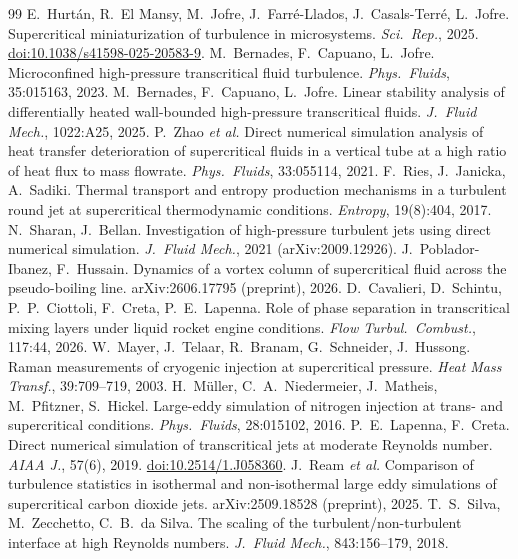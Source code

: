\documentclass[11pt]{article}
\begin{document}
\begin{thebibliography}{99}
 E.\ Hurt\'an, R.\ El Mansy, M.\ Jofre, J.\ Farr\'e-Llados, J.\ Casals-Terr\'e, L.\ Jofre. Supercritical miniaturization of turbulence in microsystems. \emph{Sci.\ Rep.}, 2025. \href{https://doi.org/10.1038/s41598-025-20583-9}{doi:10.1038/s41598-025-20583-9}.
 M.\ Bernades, F.\ Capuano, L.\ Jofre. Microconfined high-pressure transcritical fluid turbulence. \emph{Phys.\ Fluids}, 35:015163, 2023.
 M.\ Bernades, F.\ Capuano, L.\ Jofre. Linear stability analysis of differentially heated wall-bounded high-pressure transcritical fluids. \emph{J.\ Fluid Mech.}, 1022:A25, 2025.
 P.\ Zhao \emph{et al.} Direct numerical simulation analysis of heat transfer deterioration of supercritical fluids in a vertical tube at a high ratio of heat flux to mass flowrate. \emph{Phys.\ Fluids}, 33:055114, 2021.
 F.\ Ries, J.\ Janicka, A.\ Sadiki. Thermal transport and entropy production mechanisms in a turbulent round jet at supercritical thermodynamic conditions. \emph{Entropy}, 19(8):404, 2017.
 N.\ Sharan, J.\ Bellan. Investigation of high-pressure turbulent jets using direct numerical simulation. \emph{J.\ Fluid Mech.}, 2021 (arXiv:2009.12926).
 J.\ Poblador-Ibanez, F.\ Hussain. Dynamics of a vortex column of supercritical fluid across the pseudo-boiling line. arXiv:2606.17795 (preprint), 2026.
 D.\ Cavalieri, D.\ Schintu, P.\ P.\ Ciottoli, F.\ Creta, P.\ E.\ Lapenna. Role of phase separation in transcritical mixing layers under liquid rocket engine conditions. \emph{Flow Turbul.\ Combust.}, 117:44, 2026.
 W.\ Mayer, J.\ Telaar, R.\ Branam, G.\ Schneider, J.\ Hussong. Raman measurements of cryogenic injection at supercritical pressure. \emph{Heat Mass Transf.}, 39:709--719, 2003.
 H.\ M\"uller, C.\ A.\ Niedermeier, J.\ Matheis, M.\ Pfitzner, S.\ Hickel. Large-eddy simulation of nitrogen injection at trans- and supercritical conditions. \emph{Phys.\ Fluids}, 28:015102, 2016.
 P.\ E.\ Lapenna, F.\ Creta. Direct numerical simulation of transcritical jets at moderate Reynolds number. \emph{AIAA J.}, 57(6), 2019. \href{https://doi.org/10.2514/1.J058360}{doi:10.2514/1.J058360}.
 J.\ Ream \emph{et al.} Comparison of turbulence statistics in isothermal and non-isothermal large eddy simulations of supercritical carbon dioxide jets. arXiv:2509.18528 (preprint), 2025.
 T.\ S.\ Silva, M.\ Zecchetto, C.\ B.\ da Silva. The scaling of the turbulent/non-turbulent interface at high Reynolds numbers. \emph{J.\ Fluid Mech.}, 843:156--179, 2018.

\end{thebibliography}
\end{document}
